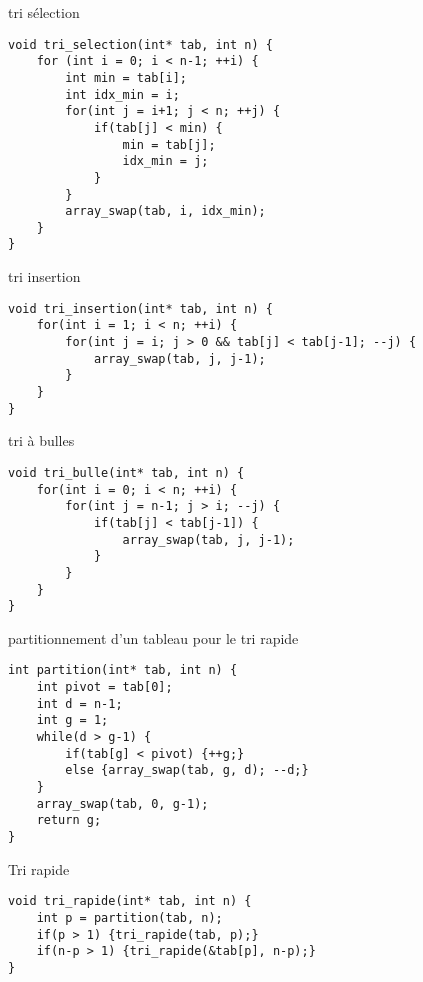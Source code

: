 \begin{imp*}{tri sélection}
\begin{verbatim}
void tri_selection(int* tab, int n) {
    for (int i = 0; i < n-1; ++i) {
        int min = tab[i];
        int idx_min = i;
        for(int j = i+1; j < n; ++j) {
            if(tab[j] < min) {
                min = tab[j];
                idx_min = j;
            }
        }
        array_swap(tab, i, idx_min);
    }
}
\end{verbatim}
\end{imp*}
\begin{imp*}{tri insertion}
\begin{verbatim}
void tri_insertion(int* tab, int n) {
    for(int i = 1; i < n; ++i) {
        for(int j = i; j > 0 && tab[j] < tab[j-1]; --j) {
            array_swap(tab, j, j-1);
        }
    }
}
\end{verbatim}
\end{imp*}
\begin{imp*}{tri à bulles}
\begin{verbatim}
void tri_bulle(int* tab, int n) {
    for(int i = 0; i < n; ++i) {
        for(int j = n-1; j > i; --j) {
            if(tab[j] < tab[j-1]) {
                array_swap(tab, j, j-1);
            }
        }
    }
}
\end{verbatim}
\end{imp*}
\begin{imp*}{partitionnement d'un tableau pour le tri rapide}
\begin{verbatim}
int partition(int* tab, int n) {
    int pivot = tab[0];
    int d = n-1;
    int g = 1;
    while(d > g-1) {
        if(tab[g] < pivot) {++g;}
        else {array_swap(tab, g, d); --d;}
    }
    array_swap(tab, 0, g-1);
    return g;
}
\end{verbatim}
\end{imp*}
\begin{imp*}{Tri rapide}
\begin{verbatim}
void tri_rapide(int* tab, int n) {
    int p = partition(tab, n);
    if(p > 1) {tri_rapide(tab, p);}
    if(n-p > 1) {tri_rapide(&tab[p], n-p);}
}
\end{verbatim}
\end{imp*}

